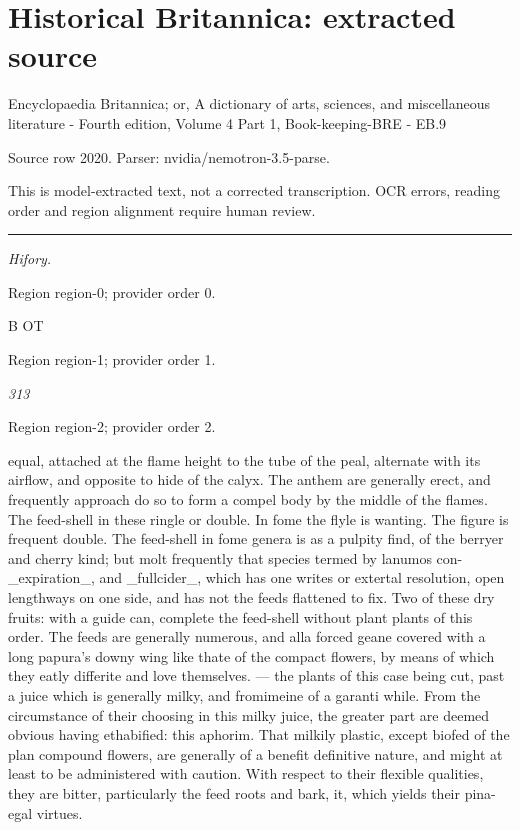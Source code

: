 \documentclass[11pt]{article}
\begin{document}
\section*{Historical Britannica: extracted source}
Encyclopaedia Britannica; or, A dictionary of arts, sciences, and miscellaneous literature - Fourth edition, Volume 4 Part 1, Book-keeping-BRE - EB.9\par
{\small Source row 2020. Parser: nvidia/nemotron-3.5-parse.\par}
{\small This is model-extracted text, not a corrected transcription. OCR errors, reading order and region alignment require human review.\par}
\hrule\medskip
{\small\itshape Hifory.\par}

{\scriptsize\color{gray} Region region-0; provider order 0.\par}
\medskip

B OT
\par

{\scriptsize\color{gray} Region region-1; provider order 1.\par}
\medskip

{\small\itshape 313\par}

{\scriptsize\color{gray} Region region-2; provider order 2.\par}
\medskip

equal, attached at the flame height to the tube of the peal, alternate with its airflow, and opposite to hide of the calyx. The anthem are generally erect, and frequently approach do so to form a compel body by the middle of the flames. The feed-shell in these ringle or double. In fome the flyle is wanting. The figure is frequent double. The feed-shell in fome genera is as a pulpity find, of the berryer and cherry kind; but molt frequently that species termed by lanumos con- \_expiration\_, and \_fullcider\_, which has one writes or extertal resolution, open lengthways on one side, and has not the feeds flattened to fix. Two of these dry fruits: with a guide can, complete the feed-shell without plant plants of this order. The feeds are generally numerous, and alla forced geane covered with a long papura’s downy wing like thate of the compact flowers, by means of which they eatly differite and love themselves. — the plants of this case being cut, past a juice which is generally milky, and fromimeine of a garanti while. From the circumstance of their choosing in this milky juice, the greater part are deemed obvious having ethabified: this aphorim. That milkily plastic, except biofed of the plan compound flowers, are generally of a benefit definitive nature, and might at least to be administered with caution. With respect to their flexible qualities, they are bitter, particularly the feed roots and bark, it, which yields their pina-egal virtues.
\par
\end{document}
